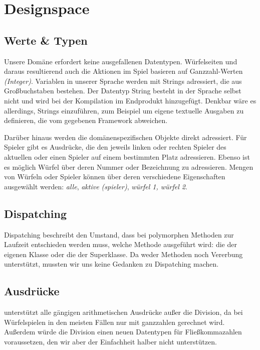 \section{Designspace} %
\label{sec:designspace}

\subsection{Werte \& Typen} %
\label{sub:werte_typen}
Unsere Domäne erfordert keine ausgefallenen Datentypen. Würfelseiten und daraus resultierend auch die Aktionen im Spiel basieren auf Ganzzahl-Werten \emph{(Integer)}. Variablen in unserer Sprache werden mit Strings adressiert, die aus Großbuchstaben bestehen. Der Datentyp String besteht in der Sprache selbst nicht und wird bei der Kompilation im Endprodukt hinzugefügt. Denkbar wäre es allerdings, Strings einzuführen, zum Beispiel um eigene textuelle Ausgaben zu definieren, die vom gegebenen Framework abweichen.

Darüber hinaus werden die domänenspezifischen Objekte direkt adressiert. Für Spieler gibt es Ausdrücke, die den jeweils linken oder rechten Spieler des aktuellen oder einen Spieler auf einem bestimmten Platz adressieren. Ebenso ist es möglich Würfel über deren Nummer oder Bezeichnung zu adressieren. Mengen von Würfeln oder Spieler können über deren verschiedene Eigenschaften ausgewählt werden: \emph{alle}, \emph{aktive (spieler)}, \emph{würfel 1, würfel 2}.

\subsection{Dispatching} %
\label{sub:dispatching}
	Dispatching beschreibt den Umstand, dass bei polymorphen Methoden zur Laufzeit entschieden werden muss, welche Methode ausgeführt wird: die der eigenen Klasse oder die der Superklasse. Da \dg weder Methoden noch Vererbung unterstützt, mussten wir uns keine Gedanken zu Dispatching machen.


\subsection{Ausdrücke} %
\label{sub:ausdrucke}
	\dg unterstützt alle gängigen arithmetischen Ausdrücke außer die Division, da bei Würfelspielen in den meisten Fällen nur mit ganzzahlen gerechnet wird. Außerdem würde die Division einen neuen Datentypen für Fließkommazahlen voraussetzen, den wir aber der Einfachheit halber nicht unterstützen.
	
